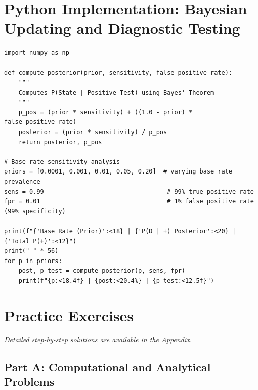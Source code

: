 \section{Python Implementation: Bayesian Updating and Diagnostic Testing}

\begin{lstlisting}[caption={Bayes' Theorem and Base Rate Sensitivity in Python}]
import numpy as np

def compute_posterior(prior, sensitivity, false_positive_rate):
    """
    Computes P(State | Positive Test) using Bayes' Theorem
    """
    p_pos = (prior * sensitivity) + ((1.0 - prior) * false_positive_rate)
    posterior = (prior * sensitivity) / p_pos
    return posterior, p_pos

# Base rate sensitivity analysis
priors = [0.0001, 0.001, 0.01, 0.05, 0.20]  # varying base rate prevalence
sens = 0.99                                  # 99% true positive rate
fpr = 0.01                                   # 1% false positive rate (99% specificity)

print(f"{'Base Rate (Prior)':<18} | {'P(D | +) Posterior':<20} | {'Total P(+)':<12}")
print("-" * 56)
for p in priors:
    post, p_test = compute_posterior(p, sens, fpr)
    print(f"{p:<18.4f} | {post:<20.4%} | {p_test:<12.5f}")
\end{lstlisting}

\newpage
\section{Practice Exercises}
\textit{Detailed step-by-step solutions are available in the Appendix.}

\subsection*{Part A: Computational and Analytical Problems}

